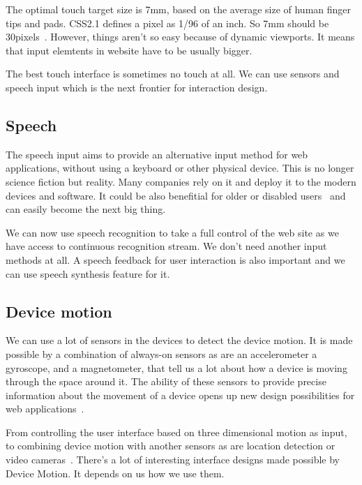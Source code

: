 \documentclass{iitsrc}
\begin{document}
The optimal touch target size is 7mm, based on the average size of human finger tips and pads. CSS2.1 defines a pixel as 1/96 of an inch. So 7mm should be 30pixels~\cite{designingfortouch}. However, things aren't so easy because of dynamic viewports. It means that input elemtents in website have to be usually bigger.

The best touch interface is sometimes no touch at all. We can use sensors and speech input which is the next frontier for interaction design.


\subsection{Speech} %
\label{sub:speech}

The speech input aims to provide an alternative input method for web applications, without using a keyboard or other physical device. This is no longer science fiction but reality. Many companies rely on it and deploy it to the modern devices and software. It could be also benefitial for older or disabled users~\cite{SpeechRecognition} and can easily become the next big thing.

We can now use speech recognition to take a full control of the web site as we have access to continuous recognition stream. We don't need another input methods at all. A speech feedback for user interaction is also important and we can use speech synthesis feature for it.


\subsection{Device motion} %
\label{sub:device_motion}

We can use a lot of sensors in the devices to detect the device motion. It is made possible by a combination of always-on sensors as are an accelerometer a gyroscope, and a magnetometer, that tell us a lot about how a device is moving through the space around it. The ability of these sensors to provide precise information about the movement of a device opens up new design possibilities for web applications~\cite{ultrabooks}.

From controlling the user interface based on three dimensional motion as input, to combining device motion with another sensors as are location detection or video cameras~\cite{AccelerationAndGyroscope}. There's a lot of interesting interface designs made possible by Device Motion. It depends on us how we use them.
\end{document}
